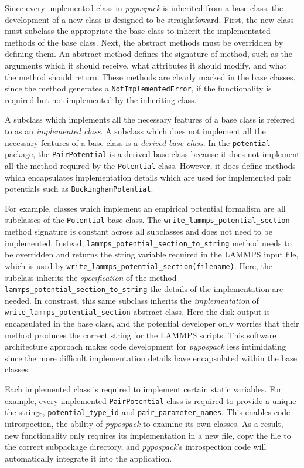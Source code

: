 Since every implemented class in \emph{pypospack} is inherited from a base class, the development of a new class is designed to be straightfoward.  First, the new class must subclass the appropriate the base class to inherit the implementated methods of the base class.  Next, the abstract methods must be overridden by defining them.   An abstract method defines the signature of method, such as the arguments which it should receive, what attributes it should modify, and what the method should return.  These methods are clearly marked in the base classes, since the method generates a \verb|NotImplementedError|, if the functionality is required but not implemented by the inheriting class.

A subclass which implements all the necessary features of a base class is referred to as an \emph{implemented class}.  A subclass which does not implement all the necessary features of a base class is a \emph{derived base class}.  In the \verb|potential| package, the \verb|PairPotential| is a derived base class because  it does not implement all the method required by the \verb|Potential| class.  However, it does define methods which encapsulates implementation details which are used for implemented pair potentials such as \verb|BuckinghamPotential|.

For example, classes which implement an empirical potential formalism are all subclasses of the \verb|Potential| base class.  The \verb|write_lammps_potential_section| method signature is constant across all subclasses and does not need to be implemented.
Instead, \verb|lammps_potential_section_to_string| method needs to be overridden and returns the string variable required in the LAMMPS input file, which is used by \verb|write_lammps_potential_section(filename)|.
Here, the subclass inherits the \emph{specification} of the method \verb|lammps_potential_section_to_string| the details of the implementation are needed.  In constrast, this same subclass inherits the \emph{implementation}  of \verb|write_lammps_potential_section| abstract class.
Here the disk output is encapsulated in the base class, and the potential developer only worries that their method produces the correct string for the LAMMPS scripts.
This software architecture approach makes code development for \emph{pypospack} less intimidating since the more difficult implementation details have encapsulated within the base classes.

Each implemented class is required to implement certain static variables.  For example, every implemented \verb|PairPotential| class is required to provide a unique the strings, \verb|potential_type_id| and \verb|pair_parameter_names|.  This enables code introspection, the ability of \emph{pypospack} to examine its own classes.  As a result, new functionality only requires its implementation in a new file, copy the file to the correct subpackage directory, and \emph{pypospack}'s introspection code will automatically integrate it into the application.


